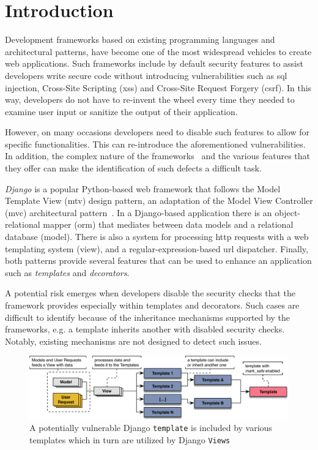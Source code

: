 \section{Introduction}
Development frameworks based on existing
programming languages and architectural patterns,
have become one of the most
widespread vehicles to create web
applications.
Such frameworks include by default
security features to assist
developers write secure code without
introducing vulnerabilities such as
{\sc sql} injection,
Cross-Site Scripting ({\sc xss}) and
Cross-Site Request Forgery ({\sc csrf}).
In this way,
developers do not have to re-invent the wheel every time they needed to examine
user input or sanitize the output of their
application.

However,
on many occasions developers need
to disable such features to
allow for specific functionalities.
This can re-introduce the
aforementioned vulnerabilities.
In addition,
the complex nature of the
frameworks~\cite{OPM15}
and the various features that they offer
can make the identification of
such defects a difficult task.

{\it Django} is a popular Python-based web
framework that follows the Model
Template View ({\sc mtv}) design pattern,
an adaptation of the
Model View Controller ({\sc mvc})
architectural pattern~\cite{GLH03, BD04}.
In a Django-based application
there is an object-relational mapper
({\sc orm}) that mediates between data models
and a relational database (model).
There is also a system for
processing {\sc http} requests with
a web templating system (view),
and a regular-expression-based
{\sc url} dispatcher.
Finally,
both patterns provide several features that
can be used to enhance an application such
as {\it templates} and {\it decorators}.

A potential risk emerges when developers
disable the security checks that the
framework provides
especially within templates and decorators.
Such cases are difficult to identify because
of the inheritance mechanisms supported
by the frameworks,
e.g. a template inherits another with
disabled security checks.
Notably,
existing mechanisms are not designed
to detect such issues.

\begin{figure}[t]
    \begin{center}
        \includegraphics[scale=0.65]{defect_2.pdf}
        \vspace{-2mm}
        \caption{A potentially vulnerable Django
        {\tt template} is included by various templates which in turn are utilized by Django
        {\tt Views}}\label{fig:defect}
    \end{center}
    \vspace{-5mm}
\end{figure}

